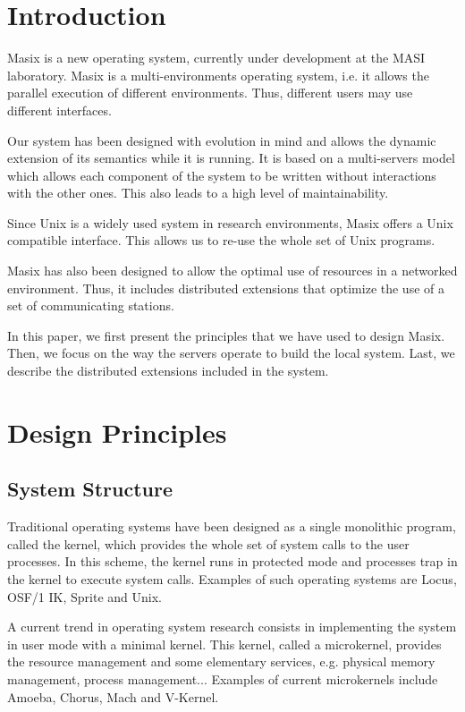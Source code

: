 \section* {Introduction}

	Masix is a new operating system, currently under development at the
MASI laboratory. Masix is a multi-environments operating system, i.e. it allows
the parallel execution of different environments. Thus, different users may
use different interfaces.

	Our system has been designed with evolution in mind and allows the
dynamic extension of its semantics while it is running. It is based on a
multi-servers model which allows each component of the system to be written
without interactions with the other ones. This also leads to a high level
of maintainability.

	Since Unix is a widely used system in research environments, Masix
offers a Unix compatible interface. This allows us to re-use the whole
set of Unix programs.

	Masix has also been designed to allow the optimal use of resources
in a networked environment. Thus, it includes distributed extensions that
optimize the use of a set of communicating stations.

	In this paper, we first present the principles that we have used to
design Masix. Then, we focus on the way the servers operate to build
the local system. Last, we describe the distributed extensions included in
the system.

\section {Design Principles}

\subsection {System Structure}

	Traditional operating systems have been designed as a single
monolithic program, called the kernel, which provides the whole set of
system calls to the user processes. In this scheme, the kernel runs in
protected mode and processes trap in the kernel to execute system calls.
Examples of such operating systems are Locus\cite {popek:walker:locus},
OSF/1 IK\cite {osf1}, Sprite\cite {ousterhout:sprite} and
Unix\cite {bach,leffler:bsd}.

	A current trend in operating system research consists in implementing
the system in user mode with a minimal kernel. This kernel, called a
microkernel, provides the resource management and some elementary services,
e.g. physical memory management, process management... Examples of current
microkernels include Amoeba\cite {mullender:amoeba},
Chorus\cite {rozier:chorus:overview}, Mach\cite {mach:foundation} and
V-Kernel\cite {cheriton:v}.

